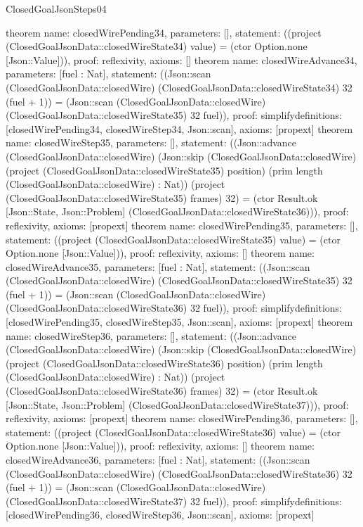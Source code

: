 \begin{lexlean}{ClosedGoalJsonSteps04}
\begin{semanticmodule}
{}
theorem{
 name: closedWirePending34, parameters: [],
 statement: ((project (ClosedGoalJsonData::closedWireState34) value) = (ctor Option.none [Json::Value])), proof: reflexivity{}, axioms: []
}
theorem{
 name: closedWireAdvance34, parameters: [fuel : Nat],
 statement: ((Json::scan (ClosedGoalJsonData::closedWire) (ClosedGoalJsonData::closedWireState34) 32 (fuel + 1)) = (Json::scan (ClosedGoalJsonData::closedWire) (ClosedGoalJsonData::closedWireState35) 32 fuel)), proof: simplify{definitions: [closedWirePending34, closedWireStep34, Json::scan]}, axioms: [propext]
}
theorem{
 name: closedWireStep35, parameters: [],
 statement: ((Json::advance (ClosedGoalJsonData::closedWire) (Json::skip (ClosedGoalJsonData::closedWire) (project (ClosedGoalJsonData::closedWireState35) position) (prim length (ClosedGoalJsonData::closedWire) : Nat)) (project (ClosedGoalJsonData::closedWireState35) frames) 32) = (ctor Result.ok [Json::State, Json::Problem] (ClosedGoalJsonData::closedWireState36))), proof: reflexivity{}, axioms: [propext]
}
theorem{
 name: closedWirePending35, parameters: [],
 statement: ((project (ClosedGoalJsonData::closedWireState35) value) = (ctor Option.none [Json::Value])), proof: reflexivity{}, axioms: []
}
theorem{
 name: closedWireAdvance35, parameters: [fuel : Nat],
 statement: ((Json::scan (ClosedGoalJsonData::closedWire) (ClosedGoalJsonData::closedWireState35) 32 (fuel + 1)) = (Json::scan (ClosedGoalJsonData::closedWire) (ClosedGoalJsonData::closedWireState36) 32 fuel)), proof: simplify{definitions: [closedWirePending35, closedWireStep35, Json::scan]}, axioms: [propext]
}
theorem{
 name: closedWireStep36, parameters: [],
 statement: ((Json::advance (ClosedGoalJsonData::closedWire) (Json::skip (ClosedGoalJsonData::closedWire) (project (ClosedGoalJsonData::closedWireState36) position) (prim length (ClosedGoalJsonData::closedWire) : Nat)) (project (ClosedGoalJsonData::closedWireState36) frames) 32) = (ctor Result.ok [Json::State, Json::Problem] (ClosedGoalJsonData::closedWireState37))), proof: reflexivity{}, axioms: [propext]
}
theorem{
 name: closedWirePending36, parameters: [],
 statement: ((project (ClosedGoalJsonData::closedWireState36) value) = (ctor Option.none [Json::Value])), proof: reflexivity{}, axioms: []
}
theorem{
 name: closedWireAdvance36, parameters: [fuel : Nat],
 statement: ((Json::scan (ClosedGoalJsonData::closedWire) (ClosedGoalJsonData::closedWireState36) 32 (fuel + 1)) = (Json::scan (ClosedGoalJsonData::closedWire) (ClosedGoalJsonData::closedWireState37) 32 fuel)), proof: simplify{definitions: [closedWirePending36, closedWireStep36, Json::scan]}, axioms: [propext]
}
\end{semanticmodule}
\end{lexlean}
